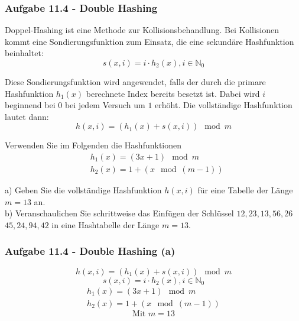 \documentclass{beamer}
\begin{document}
\begin{frame}
	\frametitle{Aufgabe 11.4 - Double Hashing}
	\scriptsize
	Doppel-Hashing ist eine Methode zur Kollisionsbehandlung. Bei Kollisionen kommt eine
	Sondierungsfunktion zum Einsatz, die eine sekundäre Hashfunktion beinhaltet:
	$$s(x, i) = i \cdot h_2(x), i \in \mathbb{N}_0$$

	Diese Sondierungsfunktion wird angewendet, falls der durch die primare Hashfunktion $h_1(x)$
	berechnete Index bereits besetzt ist. Dabei wird $i$ beginnend bei $0$ bei jedem Versuch um $1$
	erhöht. Die vollständige Hashfunktion lautet dann:
	$$h(x, i) = (h_1(x) + s(x, i)) \mod m$$

	Verwenden Sie im Folgenden die Hashfunktionen
	\begin{align*}
		 & h_1(x) = (3x + 1) \mod m      \\
		 & h_2(x) = 1 + (x \mod (m - 1))
	\end{align*}

	a) Geben Sie die vollständige Hashfunktion $h(x, i)$ für eine Tabelle der Länge $m = 13$ an. \\
	b) Veranschaulichen Sie schrittweise das Einfügen der Schlüssel $12, 23, 13, 56, 26$ $45, 24, 94, 42$ in eine Hashtabelle der Länge $m = 13$.
\end{frame}

\begin{frame}[t]
	\frametitle{Aufgabe 11.4 - Double Hashing (a)}
	\small
	$$h(x, i) = (h_1(x) + s(x, i)) \mod m$$
	$$s(x, i) = i \cdot h_2(x), i \in \mathbb{N}_0$$
	\begin{gather*}
		h_1(x) = (3x + 1) \mod m      \\
		h_2(x) = 1 + (x \mod (m - 1))
	\end{gather*}
	$$\text{Mit } m = 13$$
\end{frame}
\end{document}
